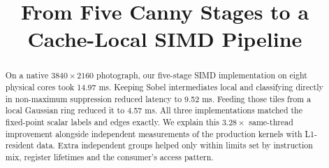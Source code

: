 \documentclass[10pt,conference,letterpaper]{IEEEtran}
\begin{document}
\title{From Five Canny Stages to a Cache-Local SIMD Pipeline}
\author{
}
\maketitle\pagestyle{plain}\thispagestyle{plain}
\begin{abstract}
On a native $3840\times2160$ photograph, our five-stage SIMD implementation on eight physical cores took 14.97 ms. Keeping Sobel intermediates local and classifying directly in non-maximum suppression reduced latency to 9.52 ms. Feeding those tiles from a local Gaussian ring reduced it to 4.57 ms. All three implementations matched the fixed-point scalar labels and edges exactly. We explain this $3.28\times$ same-thread improvement alongside independent measurements of the production kernels with L1-resident data. Extra independent groups helped only within limits set by instruction mix, register lifetimes and the consumer's access pattern.
\end{abstract}
\end{document}
